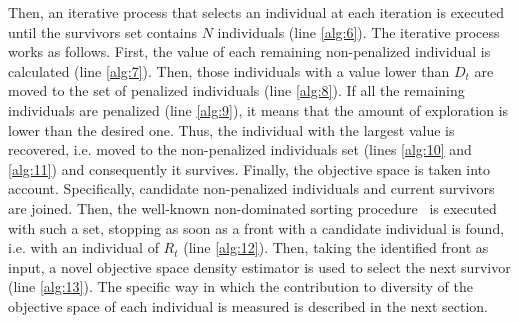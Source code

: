 Then, an iterative process that selects an individual at each iteration is executed until the survivors
set contains $N$ individuals (line \ref{alg:6}).
%
The iterative process works as follows.
%
First, the \DCS{} value of each remaining non-penalized individual is calculated (line \ref{alg:7}).
%
Then, those individuals with a \DCS{} value lower than $D_t$ are moved to the set of penalized individuals (line \ref{alg:8}).
%
If all the remaining individuals are penalized (line \ref{alg:9}), it means that the amount of exploration is lower than the
desired one.
%
Thus, the individual with the largest \DCS{} value is recovered, i.e. moved to the non-penalized individuals 
set (lines \ref{alg:10} and \ref{alg:11}) and consequently it survives.
%
Finally, the objective space is taken into account.
%
Specifically, candidate non-penalized individuals and current survivors are joined.
%
Then, the well-known non-dominated sorting procedure~\cite{Joel:NSGAII} is executed with such a set, stopping as soon as a front with 
a candidate individual is found, i.e. with an individual of $R_t$ (line \ref{alg:12}).
%
Then, taking the identified front as input, a novel objective space density estimator is used to select
the next survivor (line \ref{alg:13}).
%
The specific way in which the contribution to diversity of the objective space of each individual is measured is described in the next section.
%

%


%
%
%

%
%
%

